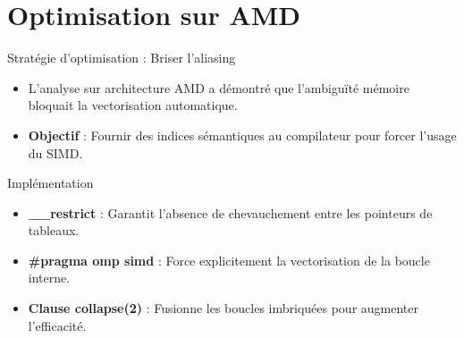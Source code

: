 \section[Optimisation]{Optimisation sur AMD}

\begin{frame}{Stratégie d'optimisation : Briser l'aliasing}
    \begin{itemize}
        \fontsize{9}{10}\selectfont
        \item L'analyse sur architecture AMD a démontré que l'ambiguïté mémoire bloquait la vectorisation automatique.
        \item \textbf{Objectif} : Fournir des indices sémantiques au compilateur pour forcer l'usage du SIMD.
    \end{itemize}
    \begin{block}{Implémentation}
        \fontsize{8}{9}\selectfont
        \begin{itemize}
            \item \textbf{\_\_restrict} : Garantit l'absence de chevauchement entre les pointeurs de tableaux.
            \item \textbf{\#pragma omp simd} : Force explicitement la vectorisation de la boucle interne.
            \item \textbf{Clause collapse(2)} : Fusionne les boucles imbriquées pour augmenter l'efficacité.
        \end{itemize}
    \end{block}
\end{frame}

